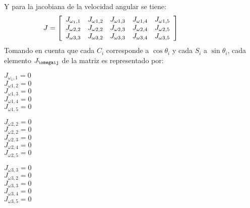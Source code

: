 \documentclass[journal, trans, spanish]{IEEEtran}
\begin{document}
 
Y para la jacobiana de la velocidad angular se tiene:
\begin{equation*}
    \hspace{-10mm}
    J = \left[
        \begin{array}{ccccc}
            J_{\omega_1 ,1} & J_{\omega1 ,2} & J_{\omega1 ,3} & J_{\omega1 ,4} & J_{\omega1 ,5}\\
            J_{\omega2 ,2} & J_{\omega2 ,2} & J_{\omega2 ,3} & J_{\omega2 ,4} & J_{\omega2 ,5}\\
            J_{\omega3 ,3 } & J_{\omega3,2} & J_{\omega3 ,3} & J_{\omega3 ,4} & J_{\omega3 ,5}\\
        \end{array}\right] 
        \hspace{10mm}
\end{equation*} 
\noindent Tomando en cuenta que cada $C_i$ corresponde a $\cos \theta_i$ y cada $S_i$ a $\sin \theta_i$, cada elemento $J_{\omegaij}$ de la matriz es representado por:
\begin{flushleft}
\(J_{\omega_1 ,1} = 0 \)\\ \vspace{0.25cm}
\(J_{\omega1 ,2} = 0\) \\ \vspace{0.25cm}
\(J_{\omega1 ,3} = 0\) \\ \vspace{0.25cm}
\(J_{\omega1 ,4} = 0\) \\ \vspace{0.25cm}
\(J_{\omega1 ,5} = 0\) \\ \vspace{0.25cm}
\end{flushleft}

\begin{flushleft}
\(J_{\omega2 ,2} = 0 \) \\ \vspace{0.25cm}
\(J_{\omega2 ,2} = 0\) \\ \vspace{0.25cm}
\(J_{\omega2 ,3} =0\) \\ \vspace{0.25cm}
\(J_{\omega2 ,4} =0\) \\ \vspace{0.25cm}
\(J_{\omega2 ,5 } =0\) \\ \vspace{0.25cm}
\end{flushleft}

\begin{flushleft}
\(J_{\omega3 ,3} = 0 \) \\ \vspace{0.25cm}
\(J_{\omega3, 2} = 0 \) \\ \vspace{0.25cm}
\(J_{\omega3 ,3} = 0 \) \\ \vspace{0.25cm}
\(J_{\omega3 ,4} = 0 \) \\ \vspace{0.25cm}
\(J_{\omega3 ,5} = 0\) \\ \vspace{0.25cm}
\end{flushleft}           
\end{document}
